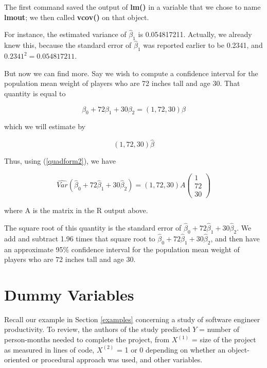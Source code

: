 The first command saved the output of {\bf lm()} in a variable that
we chose to name {\bf lmout}; we then called {\bf vcov()} on that
object.

For instance, the estimated variance of $\widehat{\beta}_1$ is
0.054817211.  Actually, we already knew this, because the standard error
of $\widehat{\beta}_1$ was reported earlier to be 0.2341, and
$0.2341^2 = 0.054817211$.  

But now we can find more.  Say we wish to compute a confidence interval
for the population mean weight of players who are 72 inches tall and age
30.  That quantity is equal to 

\begin{equation}
\beta_0 + 72 \beta_1 + 30 \beta_2 = (1,72,30) \beta
\end{equation}

which we will estimate by

\begin{equation}
(1,72,30) \widehat{\beta}
\end{equation}

Thus, using (\ref{quadform2}), we have

\begin{equation}
\label{cifor7230}
\widehat{Var}(\widehat{\beta}_0 + 72 \widehat{\beta}_1 + 30 \widehat{\beta}_2) =
(1,72,30) A 
\left (
\begin{array}{r}
1 \\
72 \\
30
\end{array}
\right )
\end{equation}

where A is the matrix in the R output above.

The square root of this quantity is the standard error of
$\widehat{\beta}_0 + 72 \widehat{\beta}_1 + 30 \widehat{\beta}_2$.  We
add and subtract 1.96 times that square root to $\widehat{\beta}_0 + 72
\widehat{\beta}_1 + 30 \widehat{\beta}_2$, and then have an approximate
95\% confidence interval for the population mean weight of players who
are 72 inches tall and age 30.  

\section{Dummy Variables}
\label{nominal}

Recall our example in Section \ref{examples} concerning a study of
software engineer productivity.  To review, the authors of the study
predicted $Y$ = number of person-months needed to complete the project,
from  $X^{(1)}$ = size of the project as measured in lines of code,
$X^{(2)}$ = 1 or 0 depending on whether an object-oriented or procedural
approach was used, and other variables.

